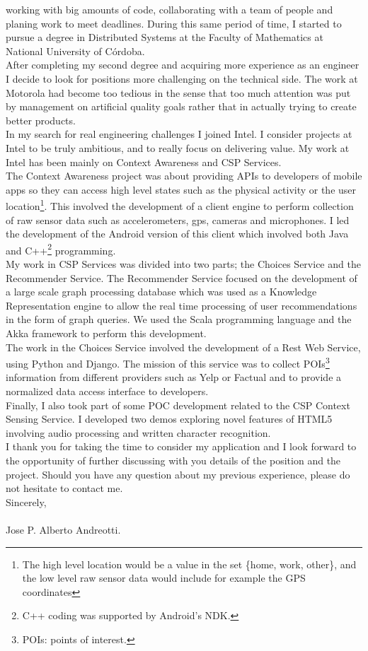 \documentclass[letter,12pt,english]{article}
\begin{document}
working with big amounts of code, collaborating with a team of people and planing work to meet deadlines.
During this same period of time, I started to pursue a degree in Distributed Systems at the Faculty of 
Mathematics at National University of C\'ordoba.
\\
After completing my second degree and acquiring more experience as an engineer I decide to look
for positions more challenging on the technical side. The work at Motorola had become too tedious
in the sense that too much attention was put by management on artificial quality goals rather
that in actually trying to create better products.
\\
In my search for real engineering challenges I joined Intel. I consider projects at Intel to be truly ambitious,
and to really focus on delivering value. My work at Intel has been mainly on Context Awareness and 
CSP Services. \\
The Context Awareness project was about providing APIs to developers of mobile apps
so they can access high level states such as the physical activity or the user 
location\footnote{The high level location would be a value in the set \{home, work, other\}, and the low
level raw sensor data would include for example the GPS coordinates}.
This involved the development of a client engine to perform collection of raw sensor data such
as accelerometers, gps, cameras and microphones. I led the development of the Android version of this client
which involved both Java and C++\footnote{C++ coding was supported by Android's NDK.} programming.\\
My work in CSP Services was divided into two parts; the Choices Service and the Recommender Service.
The Recommender Service focused on the development of a large scale graph processing database which 
was used as a Knowledge Representation engine to allow the real time processing of user recommendations in 
the form of graph queries. We used the Scala programming language and the Akka framework to perform
this development.
\\
The work in the Choices Service involved the development of a Rest Web Service, using Python and Django. 
The mission of this service was to collect POIs\footnote{POIs: points of interest.} information from
different providers such as Yelp or Factual and to provide a normalized data access interface to developers.\\
Finally, I also took part of some POC development related to the CSP Context Sensing Service. I developed
two demos exploring novel features of HTML5 involving audio processing and written character recognition.\\
I thank you for taking the time to consider my application and I look forward to the opportunity of further
discussing with you details of the position and the project. Should you have any question about my previous experience,
please do not hesitate to contact me.
\\

Sincerely,
\\
\\
Jose P. Alberto Andreotti.
\end{document}
